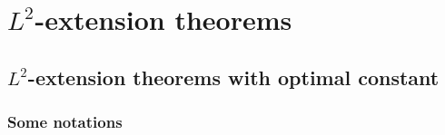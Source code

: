 \chapter{\texorpdfstring{$L^2$}{}-extension theorems}
\section{\texorpdfstring{$L^2$}{}-extension theorems with optimal constant}

\subsection{Some notations}
\newcommand{\tmop}[1]{\operatorname{#1}}
